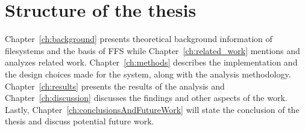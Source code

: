 \section{Structure of the thesis} %
Chapter~\ref{ch:background} presents theoretical background information of filesystems and the basis of \gls{FFS} while Chapter~\ref{ch:related_work} mentions and analyzes related work. Chapter~\ref{ch:methods} describes the implementation and the design choices made for the system, along with the analysis methodology. Chapter~\ref{ch:results} presents the results of the analysis and Chapter~\ref{ch:discussion} discusses the findings and other aspects of the work. Lastly, Chapter~\ref{ch:conclusionsAndFutureWork} will state the conclusion of the thesis and discuss potential future work.